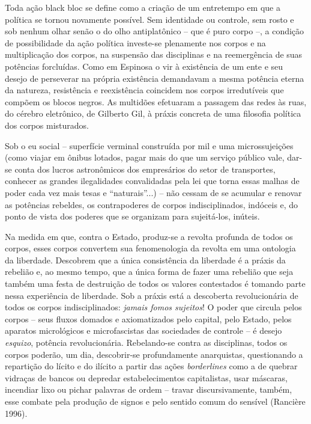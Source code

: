 Toda ação black bloc se define como a criação de um entretempo em
que a política se tornou novamente possível. Sem identidade ou controle,
sem rosto e sob nenhum olhar senão o do olho antiplatônico -- que é puro
corpo --, a condição de possibilidade da ação política investe-se
plenamente nos corpos e na multiplicação dos corpos, na suspensão das
disciplinas e na reemergência de suas potências forcluídas. Como em
Espinosa o vir à existência de um ente e seu desejo de perseverar na
própria existência demandavam a mesma potência eterna da natureza,
resistência e reexistência coincidem nos corpos irredutíveis que compõem
os blocos negros. As multidões efetuaram a passagem das redes às ruas,
do cérebro eletrônico, de Gilberto Gil, à práxis concreta de uma
filosofia política dos corpos misturados.

Sob o eu social -- superfície verminal construída por mil e uma
microssujeições (como viajar em ônibus lotados, pagar mais do que um
serviço público vale, dar-se conta dos lucros astronômicos dos
empresários do setor de transportes, conhecer as grandes ilegalidades
convalidadas pela lei que torna essas malhas de poder cada vez mais
tesas e ``naturais''...) -- não cessam de se acumular e renovar as
potências rebeldes, os contrapoderes de corpos indisciplinados, indóceis
e, do ponto de vista dos poderes que se organizam para sujeitá-los,
inúteis.

Na medida em que, contra o Estado, produz-se a revolta profunda de todos
os corpos, esses corpos convertem sua fenomenologia da revolta em uma
ontologia da liberdade. Descobrem que a única consistência da liberdade
é a práxis da rebelião e, ao mesmo tempo, que a única forma de fazer uma
rebelião que seja também uma festa de destruição de todos os valores
contestados é tomando parte nessa experiência de liberdade. Sob a práxis
está a descoberta revolucionária de todos os corpos indisciplinados:
\emph{jamais fomos sujeitos}! O poder que circula pelos corpos -- seus
fluxos domados e axiomatizados pelo capital, pelo Estado, pelos aparatos
micrológicos e microfascistas das sociedades de controle -- é desejo
\emph{esquizo}, potência revolucionária. Rebelando-se contra as
disciplinas, todos os corpos poderão, um dia, descobrir-se profundamente
anarquistas, questionando a repartição do lícito e do ilícito a partir
das ações \emph{borderlines }como a de quebrar vidraças de bancos ou
depredar estabelecimentos capitalistas, usar máscaras, incendiar lixo ou
pichar palavras de ordem -- travar discursivamente, também, esse combate
pela produção de signos e pelo sentido comum do sensível (Rancière
1996).

